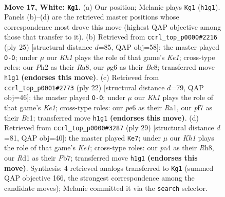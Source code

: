 \documentclass[11pt]{article}
\begin{document}
\clearpage

\begin{figure}[p]\centering
\begin{subfigure}{0.46\textwidth}\centering
\resizebox{\linewidth}{!}{%
\newchessgame
\chessboard[
  setfen={r1b2rk1/1p1n1p2/4pnp1/2b4p/p1N2B2/P3P1P1/1P3PBP/RN1R3K w - - 3 17},
  showmover=false,
  pgfstyle=straightmove, color=movearrow, markmove={h1-g1}
]}
\caption{}
\end{subfigure}\hfill
\begin{subfigure}{0.46\textwidth}\centering
\resizebox{\linewidth}{!}{%
\newchessgame
\chessboard[
  setfen={r1b1k2r/3n1pp1/pp2p2p/2bn4/P1N5/2P2N2/1P1BBPPP/R3K2R b KQkq - 1 13},
  showmover=false,
  pgfstyle=straightmove, color=movearrow, markmove={e8-g8}
]}
\caption{}
\end{subfigure}
\\[4pt]
\begin{subfigure}{0.46\textwidth}\centering
\resizebox{\linewidth}{!}{%
\newchessgame
\chessboard[
  setfen={r4rk1/1p1bppbp/1p3np1/2nP4/8/2N2NP1/PP2PPBP/R1B1K2R w KQ - 2 12},
  showmover=false,
  pgfstyle=straightmove, color=movearrow, markmove={e1-g1}
]}
\caption{}
\end{subfigure}\hfill
\begin{subfigure}{0.46\textwidth}\centering
\resizebox{\linewidth}{!}{%
\newchessgame
\chessboard[
  setfen={r3k2r/1p1n1ppp/2p1pnb1/p7/1bNP4/1P2N1P1/1P2PPBP/R1B2RK1 b kq - 3 15},
  showmover=false,
  pgfstyle=straightmove, color=movearrow, markmove={e8-e7}
]}
\caption{}
\end{subfigure}
\caption{\textbf{Move 17, White: \texttt{Kg1}.} (a) Our position; Melanie plays \texttt{Kg1} (\texttt{h1g1}). Panels (b)--(d) are the retrieved master positions whose correspondence most drove this move (highest QAP objective among those that transfer to it). (b) Retrieved from \texttt{ccrl\_top\_p0000\#2216} (ply 25) [structural distance $d$=85, QAP obj=58]: the master played \texttt{O-O}; under $\mu$ our \emph{Kh1} plays the role of that game's \emph{Ke1}; cross-type roles: our \emph{P}h2 as their \emph{R}a8, our \emph{p}g6 as their \emph{B}c8; transferred move \texttt{h1g1} \textbf{(endorses this move)}. (c) Retrieved from \texttt{ccrl\_top\_p0001\#2773} (ply 22) [structural distance $d$=79, QAP obj=46]: the master played \texttt{O-O}; under $\mu$ our \emph{Kh1} plays the role of that game's \emph{Ke1}; cross-type roles: our \emph{p}e6 as their \emph{R}a1, our \emph{p}f7 as their \emph{B}c1; transferred move \texttt{h1g1} \textbf{(endorses this move)}. (d) Retrieved from \texttt{ccrl\_top\_p0000\#3287} (ply 29) [structural distance $d$=81, QAP obj=40]: the master played \texttt{Ke7}; under $\mu$ our \emph{Kh1} plays the role of that game's \emph{Ke1}; cross-type roles: our \emph{p}a4 as their \emph{R}h8, our \emph{R}d1 as their \emph{P}b7; transferred move \texttt{h1g1} \textbf{(endorses this move)}. Synthesis: 4 retrieved analogs transferred to \texttt{Kg1} (summed QAP objective 166, the strongest correspondence among the candidate moves); Melanie committed it via the \texttt{search} selector.}
\label{fig:thought-m32}
\end{figure}
\end{document}
